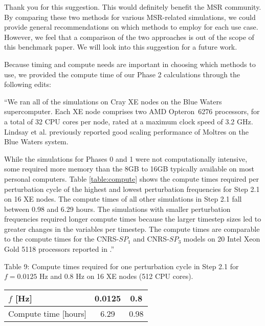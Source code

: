\documentclass[answers,12pt]{exam}
\begin{document}
\begin{questions}
        \begin{solution}
            Thank you for this suggestion. This would definitely benefit the
            MSR community. By comparing these
            two methods for various MSR-related simulations, we could provide
            general recommendations on which methods to employ for each
            use case. However, we feel that a comparison of the two approaches
            is out of the scope of this benchmark paper. We will look into
            this suggestion for a future work.
        	
        	Because timing and compute needs are important in choosing which
        	methods to use, we provided the compute time of our
        	Phase 2 calculations through the following edits:
        	
        	``We ran all of the simulations on Cray XE nodes on the Blue Waters
supercomputer. Each XE node comprises two AMD Opteron\texttrademark\ 6276
processors, for a total of 32 CPU cores per node, rated at a maximum clock
speed of 3.2 GHz. Lindsay et al. \cite{lindsay_introduction_2018} previously
reported good scaling performance of Moltres on the Blue Waters system.

While the simulations for Phases 0 and 1 were not computationally intensive,
some required more memory than the 8GB to 16GB typically available on most
personal computers. Table \ref{table:compute} shows the compute times required
per perturbation cycle of the highest and lowest perturbation frequencies for
Step 2.1 on 16 XE nodes. The compute times of all other simulations in Step 2.1
fall between 0.98 and 6.29 hours. The simulations with smaller perturbation
frequencies required longer compute times because the larger timestep sizes led
to greater changes in the variables per timestep. The compute times are
comparable to the compute times for the CNRS-$SP_1$ and CNRS-$SP_3$ models on
20 Intel\textsuperscript{\tiny\textregistered}
Xeon\textsuperscript{\tiny\textregistered} Gold 5118 processors reported in
\cite{blanco_neutronic_2021,blanco_neutronic_2020}.''

        Table 9: Compute times required for one perturbation cycle in Step 2.1
        for $f=0.0125$ Hz and $0.8$ Hz on 16 XE nodes (512 CPU cores).
	    
	    \begin{tabular}{l c c}
		    \toprule
		    $f$ [Hz] & 0.0125 & 0.8 \\
		    \midrule
		    Compute time [hours] & 6.29 & 0.98 \\
		    \bottomrule
	    \end{tabular}
        \end{solution}


\end{questions}
\end{document}
